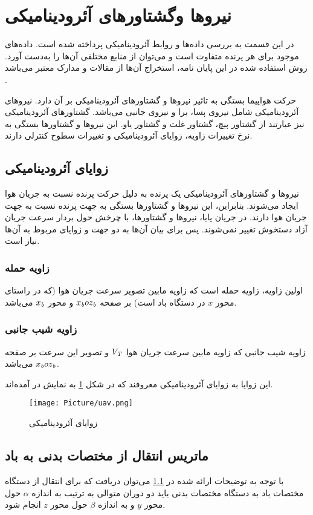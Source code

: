 \section{نیروها وگشتاورهای آئرودینامیکی}
در این قسمت به بررسی داده‌ها و روابط آئرودینامیکی پرداخته شده است.
داده‌های موجود برای هر پرنده متفاوت است و می‌توان از منابع مختلفی آن‌ها را به‌دست آورد.
روش استفاده شده در این پایان نامه، استخراج آن‌ها از مقالات و مدارک معتبر می‌باشد
\cite{chakraborty2010linear}
. 

 حرکت هواپیما بستگی به تاثیر نیروها و گشتاورهای آئرودینامیکی بر آن دارد. 
 نیروهای آئرودینامیکی شامل نیروی پسا، برا و نیروی جانبی می‌باشد. 
 گشتاورهای آئرودینامیکی نیز عبارتند از گشتاور پیچ، گشتاور غلت و گشتاور یاو.
 این نیروها و گشتاورها بستگی به نرخ تغییرات زاویه‌، زوایای آئرودینامیکی و تغییرات سطوح کنترلی دارند.
 \subsection{زوایای آئرودینامیکی }\label{AerodynamicAngles}
نیروها و گشتاورهای آئرودینامیکی یک پرنده به دلیل حرکت پرنده نسبت به جریان هوا ایجاد می‌شوند.
 بنابراین، این نیروها و گشتاورها بستگی به جهت پرنده نسبت به جهت جریان هوا دارند.
  در جریان پایا، نیروها و گشتاورها، با چرخش حول بردار سرعت جریان آزاد دستخوش تغییر نمی‌شوند.
 پس برای بیان آن‌ها به دو جهت و زوایای مربوط به آن‌ها نیاز است.
\subsubsection{زاویه حمله}  
  اولین زاویه، زاویه حمله%
  است که زاویه مابین تصویر سرعت جریان هوا  (که در راستای محور $x$ در دستگاه باد است) بر صفحه $x_{{\it b}}oz_{{\it b}}$ و محور $x_{{\it b}}$ می‌باشد.
  \subsubsection{زاویه شیب جانبی}
 زاویه شیب جانبی%
که زاویه مابین سرعت جریان هوا  $V_{{\it T}}$ و تصویر این سرعت بر صفحه $x_{{\it b}}oz_{{\it b}}$ می‌باشد.

این زوایا به زوایای آئرودینامیکی معروفند که در شکل \ref{pic:AerodynamicAngle}  به نمایش در آمده‌اند.
  \begin{figure}
  	\center
  	\texttt{[image: Picture/uav.png]}
  	\caption{زوایای آئرودینامیکی} \label{pic:AerodynamicAngle}
  \end{figure}
\subsection{ماتریس انتقال از مختصات بدنی به باد}
با توجه به توضیحات ارائه شده در \ref{AerodynamicAngles} می‌توان دریافت که برای انتقال از دستگاه مختصات باد به دستگاه مختصات بدنی باید دو دوران متوالی به ترتیب به اندازه $ \alpha $  حول محور $ y $ و به اندازه $ \beta $ حول محور $ z $ انجام شود.\cite{stevens2003aircraft}

